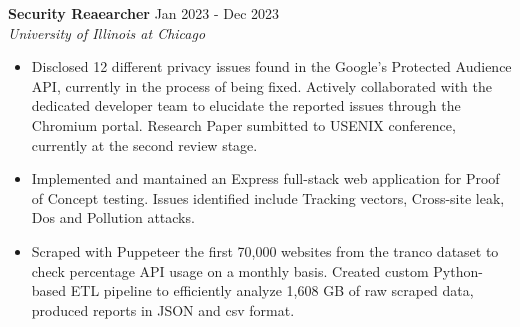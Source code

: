 
\noindent
\textbf{Security Reaearcher} \hfill Jan 2023 - Dec 2023 \\
\textit{University of Illinois at Chicago}
\begin{itemize}[noitemsep,topsep=0pt]
    \item Disclosed 12 different privacy issues found in the Google's Protected Audience API, currently in the process of being fixed. Actively collaborated with the dedicated developer team to elucidate the reported issues through the Chromium portal. Research Paper sumbitted to USENIX conference, currently at the second review stage.
    \item Implemented and mantained an Express full-stack web application for Proof of Concept testing. Issues identified include Tracking vectors, Cross-site leak, Dos and Pollution attacks.
    \item Scraped with Puppeteer the first 70,000 websites from the tranco dataset to check percentage API usage on a monthly basis. Created custom Python-based ETL pipeline to efficiently analyze 1,608 GB of raw scraped data, produced reports in JSON and csv format.
    
\end{itemize}

